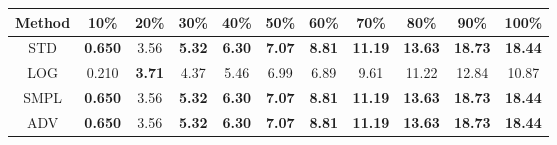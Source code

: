 \documentclass{standalone}
\begin{document}
\begin{tabular}{c|cccccccccc}
      \toprule
      Method & 10\% & 20\% & 30\% & 40\% & 50\% & 60\% & 70\% & 80\% & 90\% & 100\% \\
      \midrule
STD & \textbf{0.650} & 3.56 & \textbf{5.32} & \textbf{6.30} & \textbf{7.07} & \textbf{8.81} & \textbf{11.19} & \textbf{13.63} & \textbf{18.73} & \textbf{18.44}\\
LOG & 0.210 & \textbf{3.71} & 4.37 & 5.46 & 6.99 & 6.89 & 9.61 & 11.22 & 12.84 & 10.87\\
SMPL & \textbf{0.650} & 3.56 & \textbf{5.32} & \textbf{6.30} & \textbf{7.07} & \textbf{8.81} & \textbf{11.19} & \textbf{13.63} & \textbf{18.73} & \textbf{18.44}\\
ADV & \textbf{0.650} & 3.56 & \textbf{5.32} & \textbf{6.30} & \textbf{7.07} & \textbf{8.81} & \textbf{11.19} & \textbf{13.63} & \textbf{18.73} & \textbf{18.44}\\
  \bottomrule
\end{tabular}
\end{document}

